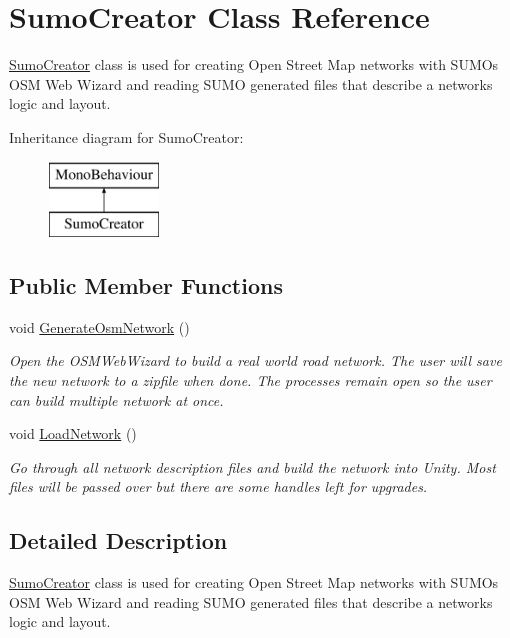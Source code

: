 \hypertarget{class_sumo_creator}{}\section{Sumo\+Creator Class Reference}
\label{class_sumo_creator}


\mbox{\hyperlink{class_sumo_creator}{Sumo\+Creator}} class is used for creating Open Street Map networks with S\+U\+MO\textquotesingle{}s O\+SM Web Wizard and reading S\+U\+MO generated files that describe a networks logic and layout.  


Inheritance diagram for Sumo\+Creator\+:\begin{figure}[H]
\begin{center}
\leavevmode
\includegraphics[height=2.000000cm]{class_sumo_creator}
\end{center}
\end{figure}
\subsection*{Public Member Functions}
\begin{DoxyCompactItemize}
\item 
void \mbox{\hyperlink{class_sumo_creator_aa1e8e70d55f358f0a1af525056627b50}{Generate\+Osm\+Network}} ()
\begin{DoxyCompactList}\small\item\em Open the O\+S\+M\+Web\+Wizard to build a real world road network. The user will save the new network to a zipfile when done. The processes remain open so the user can build multiple network at once. \end{DoxyCompactList}\item 
void \mbox{\hyperlink{class_sumo_creator_a6fd91bdf15a05d7fc2b27b9e56a07042}{Load\+Network}} ()
\begin{DoxyCompactList}\small\item\em Go through all network description files and build the network into Unity. Most files will be passed over but there are some handles left for upgrades. \end{DoxyCompactList}\end{DoxyCompactItemize}


\subsection{Detailed Description}
\mbox{\hyperlink{class_sumo_creator}{Sumo\+Creator}} class is used for creating Open Street Map networks with S\+U\+MO\textquotesingle{}s O\+SM Web Wizard and reading S\+U\+MO generated files that describe a networks logic and layout. 



